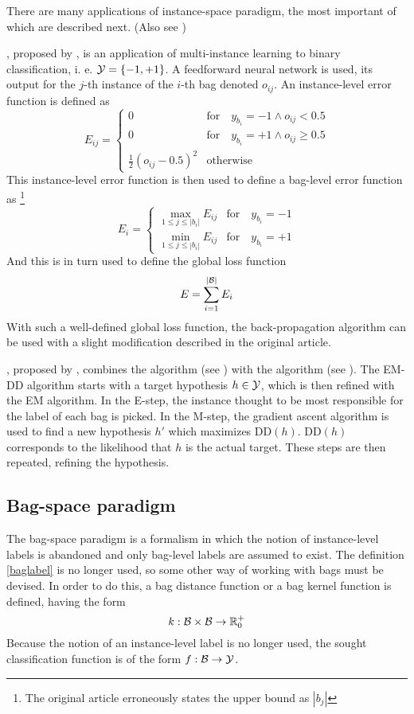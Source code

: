 There are many applications of instance-space paradigm, the most important of which are described next. (Also see \cite{andrews_support_2003} \cite{zhang_multiple_2006})

, proposed by \cite{zhou_neural_2002}, is an application of multi-instance learning to binary classification, i. e. \( \mathcal{Y} = \left\{ -1, +1 \right\} \). A feedforward neural network is used, its output for the \( j \)-th instance of the \( i \)-th bag denoted \( o_{ij} \). An instance-level error function is defined as
\[ E_{ij} = \begin{cases}
		0 &\text{for} \quad y_{b_i} = -1 \wedge o_{ij} < 0.5 \\
		0 &\text{for} \quad y_{b_i} = +1 \wedge o_{ij} \geq 0.5 \\
		\frac{1}{2} \left( o_{ij} - 0.5 \right)^2 &\text{otherwise}
	\end{cases} \]
This instance-level error function is then used to define a bag-level error function as \footnote{The original article erroneously states the upper bound as \( \left\lvert b_j \right\rvert \)}
\[ E_i = \begin{cases}
		\max_{1 \leq j \leq \left\lvert b_i \right\rvert} E_{ij} &\text{for} \quad y_{b_i} = -1 \\
		\min_{1 \leq j \leq \left\lvert b_i \right\rvert} E_{ij} &\text{for} \quad y_{b_i} = +1
	\end{cases} \]
And this is in turn used to define the global loss function
\[ E = \sum_{i = 1}^{\left\lvert \mathcal{B} \right\rvert} E_i \]
With such a well-defined global loss function, the back-propagation algorithm can be used with a slight modification described in the original article.

, proposed by \cite{zhang_em-dd:_2002}, combines the  algorithm (see \cite{dempster_maximum_1977}) with the  algorithm (see \cite{maron_framework_1998}). The EM-DD algorithm starts with a target hypothesis \( h \in \mathcal{Y} \), which is then refined with the EM algorithm. In the E-step, the instance thought to be most responsible for the label of each bag is picked. In the M-step, the gradient ascent algorithm is used to find a new hypothesis \( h' \) which maximizes \( \mathrm{DD} \left( h \right) \). \( \mathrm{DD} \left( h \right) \) corresponds to the likelihood that \( h \) is the actual target. These steps are then repeated, refining the hypothesis.

\subsection{Bag-space paradigm}
The bag-space paradigm is a formalism in which the notion of instance-level labels is abandoned and only bag-level labels are assumed to exist. The definition \ref{baglabel} is no longer used, so some other way of working with bags must be devised. In order to do this, a bag distance function or a bag kernel function is defined, having the form
\[ k : \mathcal{B} \times \mathcal{B} \to \mathbb{R}_0^+ \]
Because the notion of an instance-level label is no longer used, the sought classification function is of the form \( f : \mathcal{B} \to \mathcal{Y} \).

